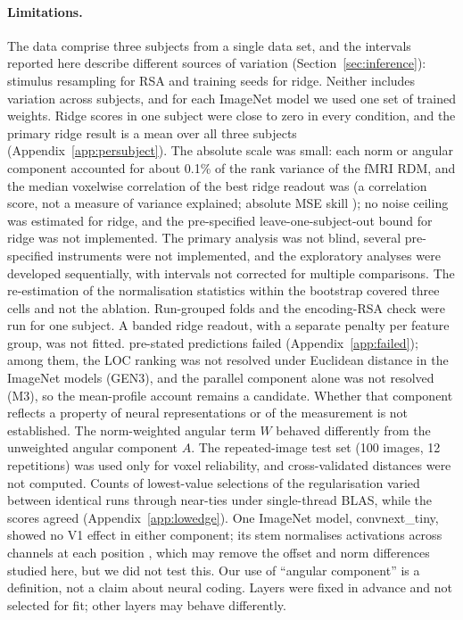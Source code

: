 \paragraph{Limitations.}
The data comprise three subjects from a single data set, and the intervals reported here
describe different sources of variation (Section~\ref{sec:inference}): stimulus resampling
for RSA and training seeds for ridge. Neither includes variation across subjects, and for
each ImageNet model we used one set of trained weights. Ridge scores in one subject were
close to zero in every condition, and the primary ridge result is a mean over all three
subjects (Appendix~\ref{app:persubject}). The absolute scale was small: each norm or angular
component accounted for about 0.1\% of the rank variance of the fMRI RDM, and the median voxelwise correlation of the best ridge readout was \PreregCondBpGFour{} (a correlation score, not a measure of variance explained; absolute MSE skill \FSkillAbsBpGFour); no noise ceiling was estimated for ridge, and the
pre-specified leave-one-subject-out bound for ridge was not implemented. The primary analysis
was not blind, several pre-specified instruments were not implemented, and the exploratory
analyses were developed sequentially, with intervals not corrected for multiple comparisons. The re-estimation of the normalisation statistics within the bootstrap covered three cells and not the ablation. Run-grouped folds and the encoding-RSA check were run for one subject. A banded ridge readout, with a separate penalty per feature group, was not fitted.
\FailedPredictions{} pre-stated predictions failed (Appendix~\ref{app:failed}); among them,
the LOC ranking was not resolved under Euclidean distance in the ImageNet models (GEN3), and
the parallel component alone was not resolved (M3), so the mean-profile account remains a candidate. Whether that component reflects a property of neural representations or of the measurement is not established. The norm-weighted angular term $W$ behaved differently from the unweighted angular
component $A$. The repeated-image test set (100 images, 12 repetitions) was used only for
voxel reliability, and cross-validated distances were not computed. Counts of lowest-value
selections of the regularisation varied between identical runs through near-ties under
single-thread BLAS, while the scores agreed (Appendix~\ref{app:lowedge}). One ImageNet model,
convnext\_tiny, showed no V1 effect in either component; its stem normalises activations
across channels at each position \citep{liu2022}, which may remove the offset and norm
differences studied here, but we did not test this. Our use of ``angular component'' is a
definition, not a claim about neural coding. Layers were fixed in advance and not selected
for fit; other layers may behave differently.

